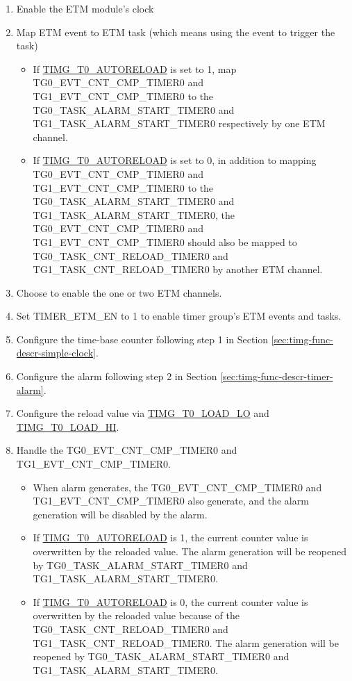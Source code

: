 \documentclass[main\_\_EN.tex]{subfiles}
\begin{document}
\begin{enumerate}
    \item Enable the ETM module's clock
    \item Map ETM event to ETM task (which means using the event to trigger the task)
    \begin{itemize}
        \item If \hyperref[fielddesc:TIMGTXAUTORELOAD]{TIMG\_T0\_AUTORELOAD} is set to 1, map TG0\_EVT\_CNT\_CMP\_TIMER0 and TG1\_EVT\_CNT\_CMP\_TIMER0 to the TG0\_TASK\_ALARM\_START\_TIMER0 and TG1\_TASK\_ALARM\_START\_TIMER0 respectively by one ETM channel.
        \item If \hyperref[fielddesc:TIMGTXAUTORELOAD]{TIMG\_T0\_AUTORELOAD} is set to 0, in addition to mapping TG0\_EVT\_CNT\_CMP\_TIMER0 and TG1\_EVT\_CNT\_CMP\_TIMER0 to the TG0\_TASK\_ALARM\_START\_TIMER0 and TG1\_TASK\_ALARM\_START\_TIMER0, the TG0\_EVT\_CNT\_CMP\_TIMER0 and TG1\_EVT\_CNT\_CMP\_TIMER0 should also be mapped to TG0\_TASK\_CNT\_RELOAD\_TIMER0 and TG1\_TASK\_CNT\_RELOAD\_TIMER0 by another ETM channel.
    \end{itemize}
    \item Choose to enable the one or two ETM channels.
    \item Set TIMER\_ETM\_EN to 1 to enable timer group's ETM events and tasks.
    \item Configure the time-base counter following step 1 in Section \ref{sec:timg-func-descr-simple-clock}.
    \item Configure the alarm following step 2 in Section \ref{sec:timg-func-descr-timer-alarm}.
    \item Configure the reload value via \hyperref[fielddesc:TIMGTXLOADLO]{TIMG\_T0\_LOAD\_LO} and \hyperref[fielddesc:TIMGTXLOADHI]{TIMG\_T0\_LOAD\_HI}.
    \item Handle the TG0\_EVT\_CNT\_CMP\_TIMER0 and TG1\_EVT\_CNT\_CMP\_TIMER0.
    \begin{itemize}
        \item When alarm generates, the TG0\_EVT\_CNT\_CMP\_TIMER0 and TG1\_EVT\_CNT\_CMP\_TIMER0 also generate, and the alarm generation will be disabled by the alarm.
        \item If \hyperref[fielddesc:TIMGTXAUTORELOAD]{TIMG\_T0\_AUTORELOAD} is 1, the current counter value is overwritten by the reloaded value. The alarm generation will be reopened by TG0\_TASK\_ALARM\_START\_TIMER0 and TG1\_TASK\_ALARM\_START\_TIMER0.
        \item If \hyperref[fielddesc:TIMGTXAUTORELOAD]{TIMG\_T0\_AUTORELOAD} is 0, the current counter value is overwritten by the reloaded value because of the TG0\_TASK\_CNT\_RELOAD\_TIMER0 and TG1\_TASK\_CNT\_RELOAD\_TIMER0. The alarm generation will be reopened by TG0\_TASK\_ALARM\_START\_TIMER0 and TG1\_TASK\_ALARM\_START\_TIMER0.

\end{itemize}
\end{enumerate}
\end{document}
